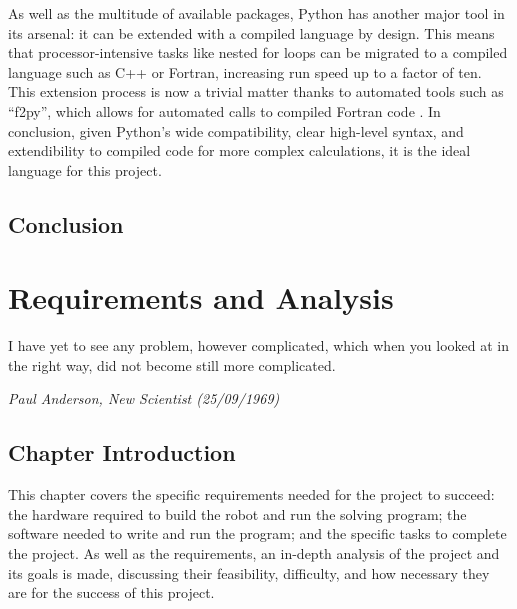 \documentclass{report}
\begin{document}
    As well as the multitude of available packages, Python has another major tool in its arsenal: it can be extended with a compiled language by design. This means that processor-intensive tasks like nested for loops can be migrated to a compiled language such as C++ or Fortran, increasing run speed up to a factor of ten. This extension process is now a trivial matter thanks to automated tools such as \enquote{f2py}, which allows for automated calls to compiled Fortran code \cite{Oliphant2006}. In conclusion, given Python’s wide compatibility, clear high-level syntax, and extendibility to compiled code for more complex calculations, it is the ideal language for this project.
    
    \section{Conclusion}
   
    \newpage
    \chapter{Requirements and Analysis}
    \epigraph{I have yet to see any problem, however complicated, which when you looked at in the right way, did not become still more complicated.}{\textit{Paul Anderson, New Scientist (25/09/1969)\cite{Anderson1969}}}
    
    \section{Chapter Introduction} %
    This chapter covers the specific requirements needed for the project to succeed: the hardware required to build the robot and run the solving program; the software needed to write and run the program; and the specific tasks to complete the project. As well as the requirements, an in-depth analysis of the project and its goals is made, discussing their feasibility, difficulty, and how necessary they are for the success of this project.
    
\end{document}
